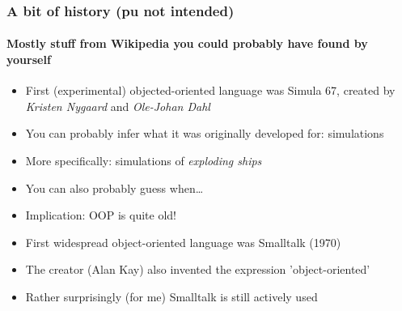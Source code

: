 \documentclass[9pt]{beamer}
\begin{document}
\begin{frame}
  \frametitle{A bit of history (pu not intended)}
  \framesubtitle{Mostly stuff from Wikipedia you could probably have found by yourself}
  \begin{itemize}
    \item First (experimental) objected-oriented language was \alert{Simula 67}, created by \emph{Kristen Nygaard} and \emph{Ole-Johan Dahl}
    \smallskip
    \item You can probably infer what it was originally developed for: simulations
    \smallskip
    \item More specifically: simulations of \emph{exploding ships}
    \smallskip
    \item You can also probably guess when\dots
    \smallskip
    \item Implication: OOP is quite old!
    \bigskip
    \item First widespread object-oriented language was \alert{Smalltalk} (1970)
    \smallskip
    \item The creator (Alan Kay) also invented the expression 'object-oriented'
    \smallskip
    \item Rather surprisingly (for me) Smalltalk is still actively used
  \end{itemize}
\end{frame}
\end{document}
